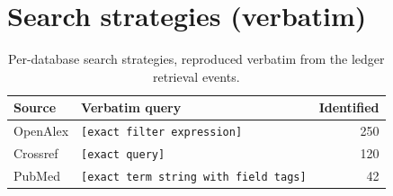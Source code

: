 \documentclass[12pt,a4paper]{article}
\begin{document}
\section{Search strategies (verbatim)}
\label{app:strategies}
\begin{table}[htbp]
\centering
\caption{Per-database search strategies, reproduced verbatim from the ledger retrieval events.}
\label{tab:strategies}
\begin{tabular}{@{}l l r@{}}
\toprule
\textbf{Source} & \textbf{Verbatim query} & \textbf{Identified} \\
\midrule
OpenAlex & \texttt{[exact filter expression]} & 250 \\
Crossref & \texttt{[exact query]}              & 120 \\
PubMed   & \texttt{[exact term string with field tags]} & 42 \\
\bottomrule
\end{tabular}
\end{table}
\end{document}
